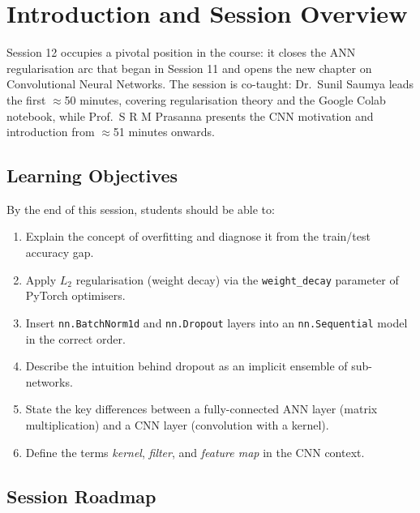 \documentclass[12pt,a4paper]{article}
\newcommand{\Ltwo}{L_2}
\begin{document}

\newpage

\section{Introduction and Session Overview}
\label{sec:intro}

Session 12 occupies a pivotal position in the course: it closes the ANN
regularisation arc that began in Session 11 and opens the new chapter on
Convolutional Neural Networks.  The session is co-taught:
Dr.\ Sunil Saumya leads the first $\approx$50 minutes, covering regularisation
theory and the Google Colab notebook, while Prof.\ S R M Prasanna presents the
CNN motivation and introduction from $\approx$51 minutes onwards.

\subsection{Learning Objectives}
\label{sec:intro:objectives}

By the end of this session, students should be able to:

\begin{enumerate}[label=\textbf{O\arabic*.}]
  \item Explain the concept of overfitting and diagnose it from the
        train/test accuracy gap.
  \item Apply $\Ltwo$ regularisation (weight decay) via the
        \texttt{weight\_decay} parameter of PyTorch optimisers.
  \item Insert \texttt{nn.BatchNorm1d} and \texttt{nn.Dropout} layers into an
        \texttt{nn.Sequential} model in the correct order.
  \item Describe the intuition behind dropout as an implicit ensemble of
        sub-networks.
  \item State the key differences between a fully-connected ANN layer (matrix
        multiplication) and a CNN layer (convolution with a kernel).
  \item Define the terms \emph{kernel}, \emph{filter}, and \emph{feature map}
        in the CNN context.
\end{enumerate}

\subsection{Session Roadmap}
\label{sec:intro:roadmap}
\end{document}
